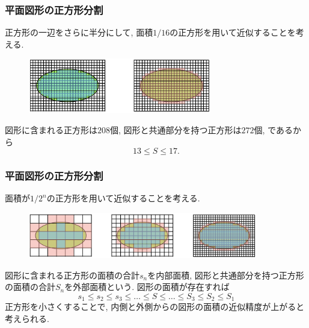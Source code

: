 \begin{frame}
\frametitle{平面図形の正方形分割}
正方形の一辺をさらに半分にして, 面積$1/16$の正方形を用いて近似することを考える. 

\begin{figure}[htbp]
 \begin{center} 
  \includegraphics[width=80mm]{calculus12/cover3.png}
 \end{center}
\end{figure}

図形に含まれる正方形は$208$個, 図形と共通部分を持つ正方形は$272$個, であるから
$$
13 \le S \le 17. 
$$

\end{frame}






\begin{frame}
\frametitle{平面図形の正方形分割}
面積が$1/2^n$の正方形を用いて近似することを考える. 

\begin{figure}[htbp]
 \begin{center} 
  \includegraphics[width=100mm]{calculus12/cover4.png}
 \end{center}
\end{figure}

図形に含まれる正方形の面積の合計$s_n$を内部面積, 図形と共通部分を持つ正方形の面積の合計$S_n$を外部面積という.  
図形の面積が存在すれば
$$
s_1 \le s_2 \le s_3 \le \dots \le S \le \dots \le S_3 \le S_2 \le S_1
$$
正方形を小さくすることで, 内側と外側からの図形の面積の近似精度が上がると考えられる. 


\end{frame}


